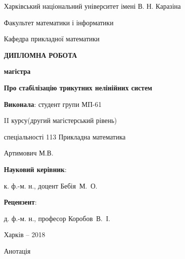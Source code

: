 \documentclass{article}
\begin{document}
\begin{large}
    \thispagestyle{empty}
    \begin{center}
    Харківський національний університет імені В. Н. Каразіна
    \end{center}
    \vspace{-1.4cm}
    \begin{center}
    {Факультет математики і інформатики}
    \end{center}
    \vspace{-1.4cm}
    \begin{center}
    {Кафедра прикладної математики}
    \end{center}
    \vspace{0.4cm}
    \end{large}
    
    \begin{center}
    {\bf ДИПЛОМНА РОБОТА}
    \end{center}
    \begin{center}
    {\bf магістра}
    \end{center}
    \vspace{.3cm}
    \begin{center}
    {\bf Про стабілізацію трикутних нелінійних систем}
    \end{center}
    
    \vspace{2.4cm}
    \hspace{5.5cm} {\bf Виконала}: студент групи МП-61
    
    \hspace{5.5cm} II курсу(другий магістерський рівень)
    
    \hspace{5.5cm} спеціальності 113 Прикладна математика
    
    \hspace{5.5cm} Артимович М.В.
    
    \hspace{5.5cm} {\bf Науковий керівник}: \par \hspace{5.5cm} к. ф.-м. н., доцент Бебія~М.~О.
    
    
    \hspace{5.5cm} {\bf Рецензент}: \par \hspace{5.5cm} д. ф.-м. н., професор Коробов~В.~І.
    
    \vspace{25mm}
    \begin{center}
    Харків -- 2018
    \end{center}
\pagebreak
\begin{center}
    Анотація
\end{center}
\end{document}
